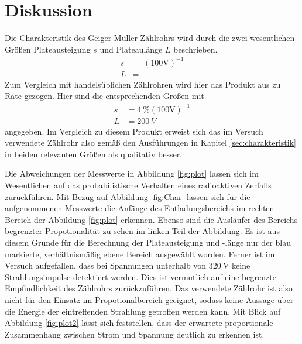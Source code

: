 \section{Diskussion}
\label{sec:Diskussion}

Die Charakteristik des Geiger-Müller-Zählrohrs wird durch die zwei wesentlichen Größen Plateausteigung $s$ und Plateaulänge $L$ beschrieben.
\begin{align*}
  s &= (100\si{\volt})^{-1} \\
  L &= 
\end{align*}
Zum Vergleich mit handelsüblichen Zählrohren wird hier das Produkt aus \cite{phywe} zu Rate gezogen. Hier sind die entsprechenden Größen mit
\begin{align*}
  s &= \SI{4}{\percent}(100\si{\volt})^{-1} \\
  L &= \SI{200}{V}
\end{align*}
angegeben. Im Vergleich zu diesem Produkt erweist sich das im Versuch verwendete Zählrohr also gemäß den Ausführungen in Kapitel \ref{sec:charakteristik} in beiden relevanten Größen als qualitativ besser.

Die Abweichungen der Messwerte in Abbildung \ref{fig:plot} lassen sich im Wesentlichen auf das probabilistische Verhalten eines radioaktiven Zerfalls zurückführen. Mit Bezug auf Abbildung \ref{fig:Char} lassen sich für die aufgenommenen Messwerte die Anfänge des Entladungsbereichs im rechten Bereich der Abbildung \ref{fig:plot} erkennen. Ebenso sind die Ausläufer des Bereichs begrenzter Propotionalität zu sehen im linken Teil der Abbildung. Es ist aus diesem Grunde für die Berechnung der Plateausteigung und -länge nur der blau markierte, verhältnismäßig ebene Bereich ausgewählt worden. Ferner ist im Versuch aufgefallen, dass bei Spannungen unterhalb von $\SI{320}{\volt}$ keine Strahlungsimpulse detektiert werden. Dies ist vermutlich auf eine begrenzte Empfindlichkeit des Zählrohrs zurückzuführen. Das verwendete Zählrohr ist also nicht für den Einsatz im Propotionalbereich geeignet, sodass keine Aussage über die Energie der eintreffenden Strahlung getroffen werden kann. Mit Blick auf Abbildung \ref{fig:plot2} lässt sich feststellen, dass der erwartete proportionale Zusammenhang zwischen Strom und Spannung deutlich zu erkennen ist.

